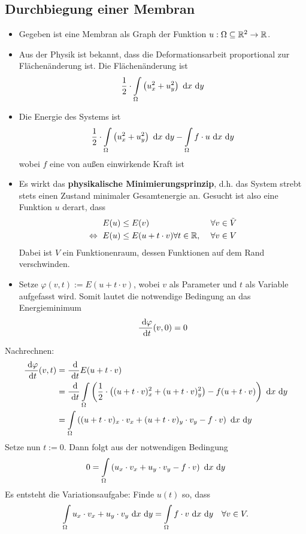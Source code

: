 \subsection{Durchbiegung einer Membran}
\begin{itemize}
\item Gegeben ist eine Membran als Graph der Funktion $u:\Omega\subseteq\mathbb{R}^2\to\mathbb{R}$.
\item Aus der Physik ist bekannt, dass die Deformationsarbeit proportional zur Flächenänderung ist. Die Flächenänderung ist
\begin{align*}
\frac{1}{2}\cdot\int\limits_\Omega\left(u^2_x+u_y^2\right)\text{ d} x\text{ d} y
\end{align*}
\item Die Energie des Systems ist 
\begin{align*}
\frac{1}{2}\cdot\int\limits_\Omega\left(u^2_x+u_y^2\right)\text{ d} x\text{ d} y-\int\limits_\Omega f\cdot u\text{ d} x\text{ d} y
\end{align*}
wobei $f$ eine von außen einwirkende Kraft ist
\item Es wirkt das \textbf{physikalische Minimierungsprinzip}, d.h. das System strebt stets einen Zustand minimaler Gesamtenergie an. Gesucht ist also eine Funktion $u$ derart, dass 
\begin{align*}
	E(u)&\leq E(v)&\forall v\in\tilde{V}\\
	\Leftrightarrow ~ E(u)&\leq E(u+t\cdot v)\forall t\in\mathbb{R},~&\forall v\in V
\end{align*}
Dabei ist $V$ ein Funktionenraum, dessen Funktionen auf dem Rand verschwinden.
\item Setze $\varphi(v,t):=E(u+t\cdot v)$, wobei $v$ als Parameter und $t$ als Variable aufgefasst wird. Somit lautet die notwendige Bedingung an das Energieminimum
\begin{align*}
\frac{\text{ d}\varphi}{\text{ d} t}(v,0)=0
\end{align*}
\end{itemize}
Nachrechnen:
\begin{align*}
\frac{\text{ d}\varphi}{\text{ d} t}(v,t)
&=\frac{\text{ d}}{\text{ d} t}E(u+t\cdot v)\\
&=\frac{\text{ d}}{\text{ d} t}\int\limits_\Omega\left(\frac{1}{2}\cdot\left((u+t\cdot v)_x^2+(u+t\cdot v)_y^2\right)-f(u+t\cdot v)\right)\text{ d} x\text{ d} y\\
&=\int\limits_\Omega\left((u+t\cdot v)_x\cdot v_x+(u+t\cdot v)_y\cdot v_y-f\cdot v\right)\text{ d} x\text{ d} y
\end{align*}
Setze nun $t:=0$. Dann folgt aus der notwendigen Bedingung
\begin{align*}
0=\int\limits_\Omega\left(u_x\cdot v_x+u_y\cdot v_y-f\cdot v\right)\text{ d} x\text{ d} y
\end{align*}
Es entsteht die Variationsaufgabe: Finde $u(t)$ so, dass 
\begin{align*}
\int\limits_\Omega u_x\cdot v_x+u_y\cdot v_y\text{ d} x\text{ d} y=\int\limits_\Omega f\cdot v\text{ d} x\text{ d} y~~~\forall v\in V.
\end{align*}

